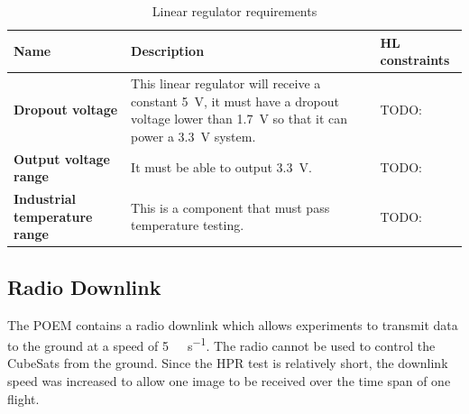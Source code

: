 \documentclass{report}
\begin{document}
\begin{table}[H]
  \centering
  \begin{tabular}{|L{0.2\textwidth}|L{0.495\textwidth}|L{0.2\textwidth}|}
    \hline
    \textbf{Name}                         & \textbf{Description}                                                                                                                                                  & \textbf{HL constraints} \\ \hline
    \textbf{Dropout voltage}              & This linear regulator will receive a constant \SI{5}{\volt}, it must have a dropout voltage lower than \SI{1.7}{\volt} so that it can power a \SI{3.3}{\volt} system. & TODO:                   \\\hline
    \textbf{Output voltage range}         & It must be able to output \SI{3.3}{\volt}.                                                                                                                            & TODO:                   \\\hline
    \textbf{Industrial temperature range} & This is a component that must pass temperature testing.                                                                                                               & TODO:                   \\\hline
  \end{tabular}
  \caption{Linear regulator requirements}
  \label{tabl:ldo-requirements}
\end{table}


\subsection{Radio Downlink}

The POEM contains a radio downlink which allows experiments to transmit data to the ground at a speed of \SI{5}{\kilo\bit\per\second}. The radio cannot be used to control the CubeSats from the ground. Since the HPR test is relatively short, the downlink speed was increased to allow one image to be received over the time span of one flight.
\end{document}
